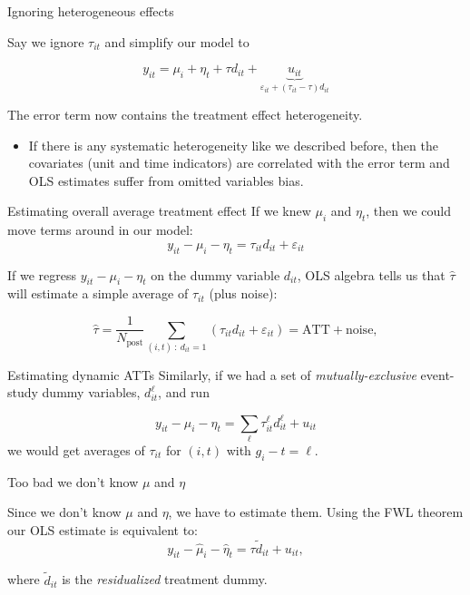 \documentclass[t]{beamer}
\begin{document}
\begin{frame}{Ignoring heterogeneous effects}

  Say we ignore $\tau_{it}$ and simplify our model to

  $$
    y_{it} = \mu_i + \eta_t + \tau d_{it} + \underbrace{u_{it}}_{ \varepsilon_{it} + (\tau_{it} - \tau) d_{it} }
  $$

  \medskip
  The error term now contains the treatment effect heterogeneity.
  \begin{itemize}
    \item If there is any systematic heterogeneity like we described before, then the covariates (unit and time indicators) are correlated with the error term and OLS estimates suffer from omitted variables bias.
  \end{itemize}
\end{frame}

\begin{frame}{Estimating overall average treatment effect}
  If we knew $\mu_i$ and $\eta_t$, then we could move terms around in our model:
  $$
  y_{it} - \mu_i - \eta_t = \tau_{it} d_{it} + \varepsilon_{it}
  $$

  \pause
  \bigskip
  If we regress $y_{it} - \mu_i - \eta_t$ on the dummy variable $d_{it}$, OLS algebra tells us that $\hat{\tau}$ will estimate a simple average of $\tau_{it}$ (plus noise):

  $$
    \hat{\tau} = \frac{1}{N_{\text{post}}} \sum_{(i,t) \ : \ d_{it} = 1} \left( \tau_{it} d_{it} + \varepsilon_{it} \right) = \text{ATT} + \text{noise},
  $$
\end{frame}

\begin{frame}{Estimating dynamic ATTs}
  Similarly, if we had a set of \emph{mutually-exclusive} event-study dummy variables, $d_{it}^\ell$, and run
  
  $$
    y_{it} - \mu_i - \eta_t = \sum_{\ell} \tau^\ell_{it} d_{it}^\ell + u_{it}
  $$
  \bigskip
  we would get averages of $\tau_{it}$ for $(i,t)$ with $g_i - t = \ell$.
\end{frame}

\begin{frame}{Too bad we don't know $\mu$ and $\eta$}

  Since we don't know $\mu$ and $\eta$, we have to estimate them. Using the FWL theorem our OLS estimate is equivalent to:
  $$
    y_{it} - \hat{\mu}_i - \hat{\eta}_t = \tau \tilde{d}_{it} + u_{it},
  $$

  where $\tilde{d}_{it}$ is the \emph{residualized} treatment dummy.
\end{frame}
\end{document}
